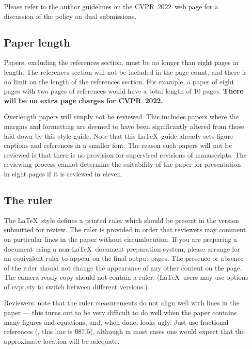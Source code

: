 \documentclass[10pt,twocolumn,letterpaper]{article}
\def\confName{CVPR}
\def\confYear{2022}
\begin{document}
Please refer to the author guidelines on the \confName\ \confYear\ web page for a
discussion of the policy on dual submissions.

\subsection{Paper length}
Papers, excluding the references section, must be no longer than eight pages in length.
The references section will not be included in the page count, and there is no limit on the length of the references section.
For example, a paper of eight pages with two pages of references would have a total length of 10 pages.
{\bf There will be no extra page charges for \confName\ \confYear.}

Overlength papers will simply not be reviewed.
This includes papers where the margins and formatting are deemed to have been significantly altered from those laid down by this style guide.
Note that this \LaTeX\ guide already sets figure captions and references in a smaller font.
The reason such papers will not be reviewed is that there is no provision for supervised revisions of manuscripts.
The reviewing process cannot determine the suitability of the paper for presentation in eight pages if it is reviewed in eleven.

\subsection{The ruler}
The \LaTeX\ style defines a printed ruler which should be present in the version submitted for review.
The ruler is provided in order that reviewers may comment on particular lines in the paper without circumlocution.
If you are preparing a document using a non-\LaTeX\ document preparation system, please arrange for an equivalent ruler to appear on the final output pages.
The presence or absence of the ruler should not change the appearance of any other content on the page.
The camera-ready copy should not contain a ruler.
(\LaTeX\ users may use options of cvpr.sty to switch between different versions.)

Reviewers:
note that the ruler measurements do not align well with lines in the paper --- this turns out to be very difficult to do well when the paper contains many figures and equations, and, when done, looks ugly.
Just use fractional references (\eg, this line is $087.5$), although in most cases one would expect that the approximate location will be adequate.
\end{document}
